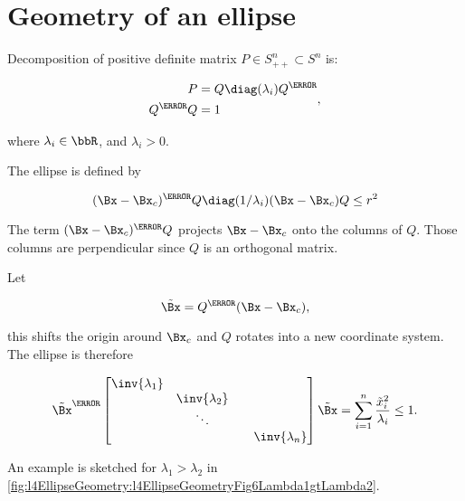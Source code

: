 \section{Geometry of an ellipse}

Decomposition of positive definite matrix \( P \in S^n_{++} \subset S^n \) is:

\begin{dmath}\label{eqn:convexOptimizationLecture4:280}
\begin{aligned}
P &= Q \diag(\lambda_i) Q^\T \\
Q^\T Q &= 1
\end{aligned},
\end{dmath}

where \( \lambda_i \in \bbR\), and \(\lambda_i > 0 \).

The ellipse is defined by

\begin{equation}\label{eqn:convexOptimizationLecture4:300}
(\Bx - \Bx_c)^\T Q \diag(1/\lambda_i) (\Bx - \Bx_c) Q \le r^2
\end{equation}

The term \( (\Bx - \Bx_c)^\T Q \) projects \( \Bx - \Bx_c \) onto the columns of \( Q \).  Those columns are perpendicular since \( Q \) is an orthogonal matrix.

Let

\begin{equation}\label{eqn:convexOptimizationLecture4:320}
\tilde{\Bx} = Q^\T (\Bx - \Bx_c),
\end{equation}

this shifts the origin around \( \Bx_c \) and \( Q \) rotates into a new coordinate system.
The ellipse is therefore

\begin{equation}\label{eqn:convexOptimizationLecture4:340}
\tilde{\Bx}^\T
\begin{bmatrix}
\inv{\lambda_1} &                &        & \\
                &\inv{\lambda_2} &        & \\
                                 & \ddots & \\
                &                &        & \inv{\lambda_n}
\end{bmatrix}
\tilde{\Bx}
=
\sum_{i = 1}^n \frac{\tilde{x}_i^2}{\lambda_i} \le 1.
\end{equation}

An example is sketched for \( \lambda_1 > \lambda_2 \) in \cref{fig:l4EllipseGeometry:l4EllipseGeometryFig6Lambda1gtLambda2}.

